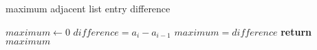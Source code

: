 \documentclass[a4paper, 12pt]{article}
\begin{document}
	
	\begin{algorithm}

		\renewcommand{\thealgorithm}{3.1.4}
		
		\caption{maximum adjacent list entry difference}
		
		\begin{algorithmic}[1]
			
			\State $maximum \gets 0$
				\State\texttt{$difference = a_i - a_{i-1}$}
					\State $maximum = difference$
				\EndIf
			\EndFor
			\State \textbf{return} $maximum$ 
			\EndProcedure
			
		\end{algorithmic}

	\end{algorithm}
\end{document}
